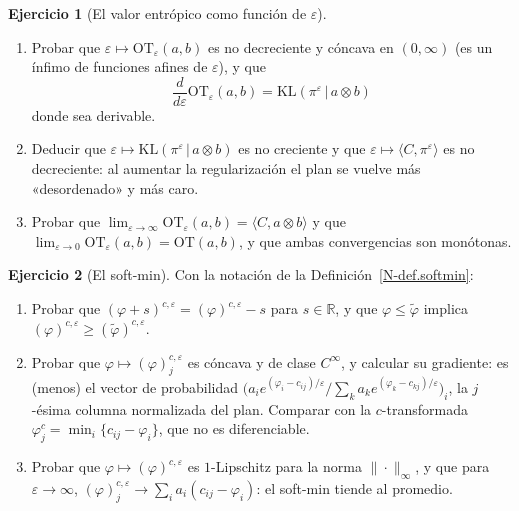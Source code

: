 \documentclass[11pt,a4paper]{amsart}
\newcounter{chapter}
\newcommand{\ve}{\varepsilon}
\newcommand{\R}{{\mathbb R}}
\theoremstyle{remark}
\theoremstyle{definition}
\newtheorem{ejercicio}{Ejercicio}[chapter]
\numberwithin{subsection}{section}
\numberwithin{equation}{section}
\begin{document}
\begin{ejercicio}[El valor entrópico como función de $\ve$]\label{ejer.OTeps.concavo}
\leavevmode
\begin{enumerate}[label=(\alph*)]
\item Probar que $\ve\mapsto\mathrm{OT}_\ve(a,b)$ es no decreciente y cóncava
en $(0,\infty)$ (es un ínfimo de funciones afines de $\ve$), y que
\[
\frac{d}{d\ve}\mathrm{OT}_\ve(a,b)=\mathrm{KL}(\pi^\ve\,|\,a\otimes b)
\]
donde sea derivable.
\item Deducir que $\ve\mapsto\mathrm{KL}(\pi^\ve\,|\,a\otimes b)$ es no
creciente y que $\ve\mapsto\langle C,\pi^\ve\rangle$ es no decreciente:
al aumentar la regularización el plan se vuelve más «desordenado» y más
caro.
\item Probar que $\lim_{\ve\to\infty}\mathrm{OT}_\ve(a,b)=\langle C,a\otimes b\rangle$
y que $\lim_{\ve\to0}\mathrm{OT}_\ve(a,b)=\mathrm{OT}(a,b)$, y que ambas
convergencias son monótonas.
\end{enumerate}
\end{ejercicio}

\begin{ejercicio}[El soft-min]\label{ejer.softmin}
Con la notación de la Definición~\ref{N-def.softmin}:
\begin{enumerate}[label=(\alph*)]
\item Probar que $(\varphi+s)^{c,\ve}=(\varphi)^{c,\ve}-s$ para $s\in\R$, y
que $\varphi\le\tilde\varphi$ implica $(\varphi)^{c,\ve}\ge(\tilde\varphi)^{c,\ve}$.
\item Probar que $\varphi\mapsto(\varphi)^{c,\ve}_j$ es cóncava y de clase
$C^\infty$, y calcular su gradiente: es (menos) el vector de probabilidad
$\bigl(a_ie^{(\varphi_i-c_{ij})/\ve}/\sum_ka_ke^{(\varphi_k-c_{kj})/\ve}\bigr)_i$,
la $j$-ésima columna normalizada del plan. Comparar con la $c$-transformada
$\varphi^c_j=\min_i\{c_{ij}-\varphi_i\}$, que no es diferenciable.
\item Probar que $\varphi\mapsto(\varphi)^{c,\ve}$ es $1$-Lipschitz para la
norma $\|\cdot\|_\infty$, y que para $\ve\to\infty$,
$(\varphi)^{c,\ve}_j\to\sum_ia_i(c_{ij}-\varphi_i)$: el soft-min tiende al
promedio.
\end{enumerate}
\end{ejercicio}
\end{document}
